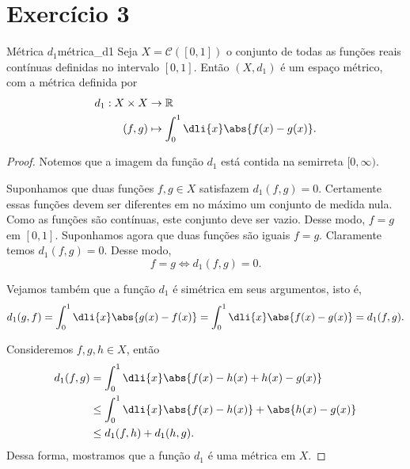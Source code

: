 \section*{Exercício 3}
\begin{proposition}{Métrica \(d_1\)}{métrica_d1}
    Seja \(X = \mathcal{C}([0,1])\) o conjunto de todas as funções reais contínuas definidas no intervalo \([0,1]\). Então \((X, d_1)\) é um espaço métrico, com a métrica definida por
    \begin{align*}
        d_1 : X \times X &\to \mathbb{R}\\
        (f,g) &\mapsto \int_0^1 \dli{x} \abs{f(x) - g(x)}.
    \end{align*}
\end{proposition}
\begin{proof}
    Notemos que a imagem da função \(d_1\) está contida na semirreta \([0,\infty)\).

    Suponhamos que duas funções \(f,g \in X\) satisfazem \(d_1(f,g)=0\). Certamente essas funções devem ser diferentes em no máximo um conjunto de medida nula. Como as funções são contínuas, este conjunto deve ser vazio. Desse modo, \(f = g\) em \([0,1]\).
    Suponhamos agora que duas funções são iguais \(f = g\). Claramente temos \(d_1(f,g) = 0\). Desse modo,
    \begin{equation*}
        f = g \iff d_1(f,g) = 0.
    \end{equation*}

    Vejamos também que a função \(d_1\) é simétrica em seus argumentos, isto é,
    \begin{equation*}
        d_1(g,f) = \int_0^1 \dli{x} \abs{g(x) - f(x)} = \int_0^1 \dli{x} \abs{f(x) - g(x)} = d_1(f,g).
    \end{equation*}

    Consideremos \(f,g,h \in X\), então
    \begin{align*}
        d_1(f,g) &= \int_0^1 \dli{x} \abs{f(x) - h(x) + h(x) - g(x)}\\
                 &\leq \int_0^1 \dli{x} \abs{f(x) - h(x)} + \abs{h(x) - g(x)}\\
                 &\leq d_1(f,h) + d_1(h,g).
    \end{align*}
    Dessa forma, mostramos que a função \(d_1\) é uma métrica em \(X\).
\end{proof}
